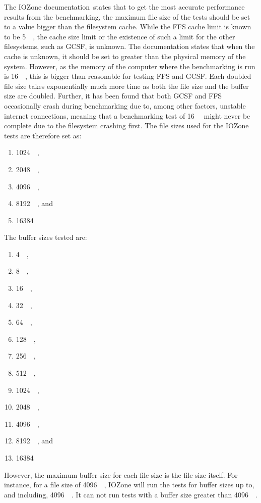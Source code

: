The IOZone documentation\,\cite{iozoneIozoneFilesystemBenchmark} states that to get the most accurate performance results from the benchmarking, the maximum file size of the tests should be set to a value bigger than the filesystem cache. While the \gls{FFS} cache limit is known to be \SI{5}{\mega\byte}, the cache size limit or the existence of such a limit for the other filesystems, such as \gls{GCSF}, is unknown. The documentation states that when the cache is unknown, it should be set to greater than the physical memory of the system. However, as the memory of the computer where the benchmarking is run is \SI{16}{\giga\byte}, this is bigger than reasonable for testing \gls{FFS} and \gls{GCSF}. Each doubled file size takes exponentially much more time as both the file size and the buffer size are doubled. Further, it has been found that both \gls{GCSF} and \gls{FFS} occasionally crash during benchmarking due to, among other factors, unstable internet connections, meaning that a benchmarking test of \SI{16}{\giga\byte} might never be complete due to the filesystem crashing first. The file sizes used for the IOZone tests are therefore set as:
\begin{enumerate}
	\item \SI{1024}{\kilo\byte},
	\item \SI{2048}{\kilo\byte},
	\item \SI{4096}{\kilo\byte},
	\item \SI{8192}{\kilo\byte}, and
	\item \SI{16384}{\kilo\byte}
\end{enumerate}
The buffer sizes tested are:
\begin{enumerate}
	\item \SI{4}{\kilo\byte},
	\item \SI{8}{\kilo\byte},
	\item \SI{16}{\kilo\byte},
	\item \SI{32}{\kilo\byte},
	\item \SI{64}{\kilo\byte},
	\item \SI{128}{\kilo\byte},
	\item \SI{256}{\kilo\byte},
	\item \SI{512}{\kilo\byte},
	\item \SI{1024}{\kilo\byte},
	\item \SI{2048}{\kilo\byte},
	\item \SI{4096}{\kilo\byte},
	\item \SI{8192}{\kilo\byte}, and
	\item \SI{16384}{\kilo\byte}
\end{enumerate}
However, the maximum buffer size for each file size is the file size itself. For instance, for a file size of \SI{4096}{\kilo\byte}, IOZone will run the tests for buffer sizes up to, and including, \SI{4096}{\kilo\byte}. It can not run tests with a buffer size greater than \SI{4096}{\kilo\byte}.

